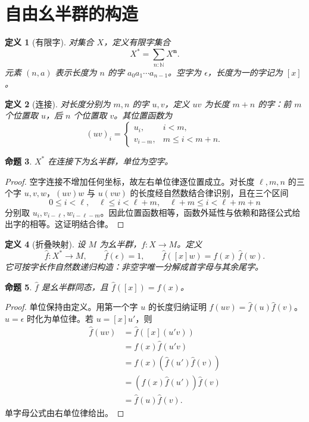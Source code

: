 \documentclass[12pt,oneside,openany,fontset=none]{ctexbook}
\theoremstyle{cn}
\newtheorem{definition}{定义}[chapter]
\newtheorem{proposition}[definition]{命题}
\numberwithin{equation}{chapter}
\newcommand{\N}{\mathbb N}
\begin{document}
\section{自由幺半群的构造}
\begin{definition}[有限字]
对集合 $X$，定义有限字集合
\[
X^*=\sum_{n:\N}X^{\mathbf n}.
\]
元素 $(n,a)$ 表示长度为 $n$ 的字 $a_0a_1\cdots a_{n-1}$。空字为 $\epsilon$，长度为一的字记为 $[x]$。
\end{definition}
\begin{definition}[连接]
对长度分别为 $m,n$ 的字 $u,v$，定义 $uv$ 为长度 $m+n$ 的字：前 $m$ 个位置取 $u$，后 $n$ 个位置取 $v$。其位置函数为
\[
(uv)_i=
\begin{cases}
u_i,&i<m,\\
v_{i-m},&m\le i<m+n.
\end{cases}
\]

\end{definition}
\begin{proposition}
$X^*$ 在连接下为幺半群，单位为空字。
\end{proposition}
\begin{proof}
空字连接不增加任何坐标，故左右单位律逐位置成立。对长度 $\ell,m,n$ 的三个字 $u,v,w$，$(uv)w$ 与 $u(vw)$ 的长度经自然数结合律识别，且在三个区间
\[
0\le i<\ell,\quad
\ell\le i<\ell+m,\quad
\ell+m\le i<\ell+m+n
\]
分别取 $u_i,v_{i-\ell},w_{i-\ell-m}$。因此位置函数相等，函数外延性与依赖和路径公式给出字的相等。这证明结合律。
\end{proof}
\begin{definition}[折叠映射]
设 $M$ 为幺半群，$f:X\to M$。定义
\[
\widehat f:X^*\to M,
\qquad
\widehat f(\epsilon)=1,
\qquad
\widehat f([x]w)=f(x)\,\widehat f(w).
\]
它可按字长作自然数递归构造：非空字唯一分解成首字母与其余尾字。
\end{definition}
\begin{proposition}
$\widehat f$ 是幺半群同态，且 $\widehat f([x])=f(x)$。
\end{proposition}
\begin{proof}
单位保持由定义。用第一个字 $u$ 的长度归纳证明
$\widehat f(uv)=\widehat f(u)\widehat f(v)$。$u=\epsilon$ 时化为单位律。若 $u=[x]u'$，则
\begin{align*}
\widehat f(uv)
&=\widehat f([x](u'v))\\
&=f(x)\widehat f(u'v)\\
&=f(x)(\widehat f(u')\widehat f(v))\\
&=(f(x)\widehat f(u'))\widehat f(v)\\
&=\widehat f(u)\widehat f(v).
\end{align*}
单字母公式由右单位律给出。
\end{proof}
\end{document}
